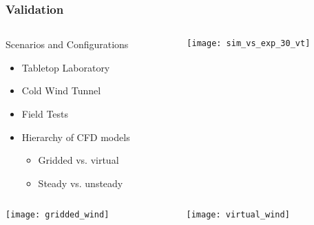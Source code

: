 \documentclass[mathserif]{beamer}
\begin{document}
%
%
%
\begin{frame}
 \frametitle{Validation}

 \begin{columns}[]
  \begin{column}{0.55\linewidth}

   \begin{block}{Scenarios and Configurations}
    \begin{itemize}
     \item Tabletop Laboratory
     \item Cold Wind Tunnel
     \item Field Tests
     \item Hierarchy of CFD models 
	   \begin{itemize}
	    \item Gridded vs. virtual
	    \item Steady vs. unsteady
	   \end{itemize}
    \end{itemize}
    \end{block}

  \end{column}

  \begin{column}{0.45\linewidth}
  \begin{center}
   \texttt{[image: sim\_vs\_exp\_30\_vt]}
  \end{center}
  \end{column}
  \end{columns}

 
 \begin{columns}[]
  \begin{column}{0.55\linewidth}
   
   \begin{center}
    \texttt{[image: gridded\_wind]}
   \end{center}
\end{column}
 \begin{column}{0.55\linewidth}
   \begin{center}
    \texttt{[image: virtual\_wind]}
   \end{center}
\end{column}
 \end{columns}


\end{frame}


\end{document}
